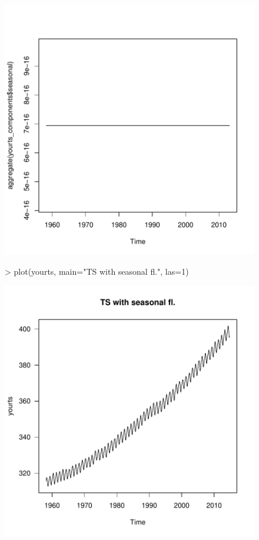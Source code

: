 \documentclass[11pt, a4paper]{article} %
\begin{document}
\begin{figure}[H]
\includegraphics{sweaveclean-seasonal_component}
\begin{Schunk}
\begin{Sinput}
> plot(yourts, main="TS with seasonal fl.", las=1)
\end{Sinput}
\end{Schunk}
\includegraphics{sweaveclean-seasonallyadjusted}

\end{figure}
\end{document}
